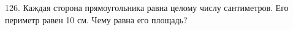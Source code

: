 126. Каждая сторона прямоугольника равна целому числу сантиметров. Его периметр равен 10 см. Чему равна его площадь?\\
